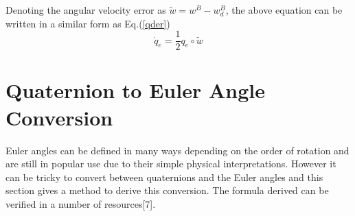 \documentclass{article}
\begin{document}
		Denoting the angular velocity error as $\tilde{w}=w^B-w_d^B$, the above equation can be written in a similar form as Eq.(\ref{qder})
		\begin{equation}
				\dot{q}_e = \frac{1}{2}q_e\circ \tilde{w}
				\label{qeder2}
		\end{equation}
		
		
	
 \section{Quaternion to Euler Angle Conversion}
 
 Euler angles can be defined in many ways depending on the order of rotation and are still in popular use due to their simple physical interpretations. However it can be tricky to convert between quaternions and the Euler angles and this section gives a method to derive this conversion. The formula derived can be verified in a number of resources[7].
 
\end{document}
